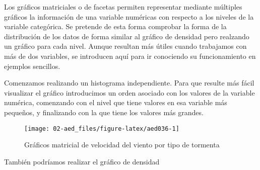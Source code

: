 \documentclass[
]{book}
\newenvironment{Shaded}{\begin{snugshade}}{\end{snugshade}}
\newcommand{\AttributeTok}[1]{\textcolor[rgb]{0.77,0.63,0.00}{#1}}
\newcommand{\CommentTok}[1]{\textcolor[rgb]{0.56,0.35,0.01}{\textit{#1}}}
\newcommand{\DecValTok}[1]{\textcolor[rgb]{0.00,0.00,0.81}{#1}}
\newcommand{\FunctionTok}[1]{\textcolor[rgb]{0.00,0.00,0.00}{#1}}
\newcommand{\NormalTok}[1]{#1}
\newcommand{\OtherTok}[1]{\textcolor[rgb]{0.56,0.35,0.01}{#1}}
\newcommand{\SpecialCharTok}[1]{\textcolor[rgb]{0.00,0.00,0.00}{#1}}
\newcommand{\StringTok}[1]{\textcolor[rgb]{0.31,0.60,0.02}{#1}}
\begin{document}
Los gráficos matriciales o de facetas permiten representar mediante múltiples gráficos la información de una variable numéricas con respecto a los niveles de la variable categórica. Se pretende de esta forma comprobar la forma de la distribución de los datos de forma similar al gráfico de densidad pero realzando un gráfico para cada nivel. Aunque resultan más útiles cuando trabajamos con más de dos variables, se introducen aquí para ir conociendo su funcionamiento en ejemplos sencillos.

Comenzamos realizando un histograma independiente. Para que resulte más fácil visualizar el gráfico introducimos un orden asociado con los valores de la variable numérica, comenzando con el nivel que tiene valores en esa variable más pequeños, y finalizando con la que tiene los valores más grandes.

\begin{Shaded}
\end{Shaded}

\begin{figure}

{\centering \texttt{[image: 02-aed\_files/figure-latex/aed036-1]} 

}

\caption{Gráficos matricial de velocidad del viento por tipo de tormenta}\label{fig:aed036}
\end{figure}

También podríamos realizar el gráfico de densidad
\end{document}
